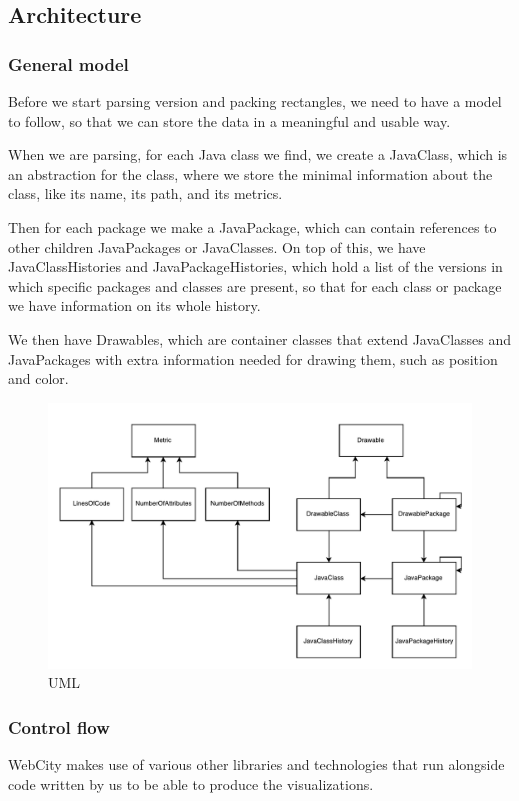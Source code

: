 \documentclass[]{usiinfbachelorproject}
\begin{document}
\subsection{Architecture} \label{Architecture}

\subsubsection{General model} \label{General model}
Before we start parsing version and packing rectangles, we need to have a model to follow, so that we can store the data in a meaningful and usable way.

When we are parsing, for each Java class we find, we create a JavaClass, which is an abstraction for the class, where we store the minimal information about the class, like its name, its path, and its metrics.

Then for each package we make a JavaPackage, which can contain references to other children JavaPackages or JavaClasses.
On top of this, we have JavaClassHistories and JavaPackageHistories, which hold a list of the versions in which specific packages and classes are present, so that for each class or package we have information on its whole history.

We then have Drawables, which are container classes that extend JavaClasses and JavaPackages with extra information needed for drawing them, such as position and color.

\begin{figure} [H]
\centering
\includegraphics[width=1\textwidth]{pictures/models.pdf}
\caption{UML}
\label{fig:UML}
\end{figure}

\subsubsection{Control flow} \label{Control flow}
WebCity makes use of various other libraries and technologies that run alongside code written by us to be able to produce the visualizations.
\end{document}
